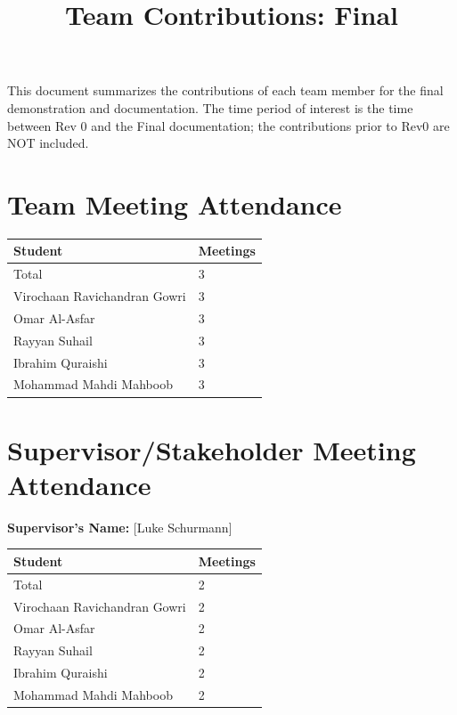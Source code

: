 \documentclass{article}
\title{Team Contributions: Final\\\progname}
\author{\authname}
\date{}
\begin{document}
\maketitle

This document summarizes the contributions of each team member for the final
demonstration and documentation.  The time period of interest is the time
between Rev 0 and the Final documentation; the contributions prior to Rev0 are
NOT included.

\section{Team Meeting Attendance}

\begin{table}[H]
\centering
\begin{tabular}{ll}
\toprule
\textbf{Student} & \textbf{Meetings}\\
\midrule
Total & 3\\
Virochaan Ravichandran Gowri & 3\\
Omar Al-Asfar & 3\\
Rayyan Suhail & 3\\
Ibrahim Quraishi & 3\\
Mohammad Mahdi Mahboob & 3\\
\bottomrule
\end{tabular}
\end{table}

\section{Supervisor/Stakeholder Meeting Attendance}

\noindent \textbf{Supervisor's Name: } [Luke Schurmann]

\begin{table}[H]
\centering
\begin{tabular}{ll}
\toprule
\textbf{Student} & \textbf{Meetings}\\
\midrule
Total & 2\\
Virochaan Ravichandran Gowri & 2\\
Omar Al-Asfar & 2\\
Rayyan Suhail & 2\\
Ibrahim Quraishi & 2\\
Mohammad Mahdi Mahboob & 2\\
\bottomrule
\end{tabular}
\end{table}
\end{document}
